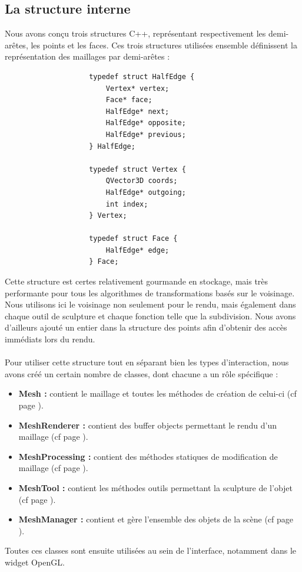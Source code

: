 \documentclass[a4paper]{memoir}
\begin{document}
			\subsection{La structure interne}
				Nous avons conçu trois structures C++, représentant respectivement les demi-arêtes, les points et les faces. Ces trois structures utilisées 
				ensemble définissent la représentation des maillages par demi-arêtes :
				\begin{verbatim}
					typedef struct HalfEdge {
					    Vertex* vertex;
					    Face* face;
					    HalfEdge* next;
					    HalfEdge* opposite;
					    HalfEdge* previous;
					} HalfEdge;

					typedef struct Vertex {
					    QVector3D coords;
					    HalfEdge* outgoing;
					    int index;
					} Vertex;

					typedef struct Face {
					    HalfEdge* edge;
					} Face;
				\end{verbatim}
				Cette structure est certes relativement gourmande en stockage, mais très performante pour tous les algorithmes de transformations basés sur 
				le voisinage. Nous utilisons ici le voisinage non seulement pour le rendu, mais également dans chaque outil de sculpture et chaque fonction 
				telle que la subdivision. Nous avons d'ailleurs ajouté un entier dans la structure des points afin d'obtenir des accès immédiats lors du 
				rendu.\\
				\\
				Pour utiliser cette structure tout en séparant bien les types d'interaction, nous avons créé un certain nombre de classes, dont chacune a un 
				rôle spécifique :
				\begin{itemize}
					\item \textbf{Mesh :} contient le maillage et toutes les méthodes de création de celui-ci (cf page \pageref{mesh-dev}).
					\item \textbf{MeshRenderer :} contient des buffer objects permettant le rendu d'un maillage (cf page \pageref{renderer-dev}).
					\item \textbf{MeshProcessing :} contient des méthodes statiques de modification de maillage (cf page \pageref{processing-dev}).
					\item \textbf{MeshTool :} contient les méthodes outils permettant la sculpture de l'objet (cf page \pageref{tool-dev}).
					\item \textbf{MeshManager :} contient et gère l'ensemble des objets de la scène (cf page \pageref{manager-dev}).
				\end{itemize}
				Toutes ces classes sont ensuite utilisées au sein de l'interface, notamment dans le widget OpenGL.
				
\end{document}
